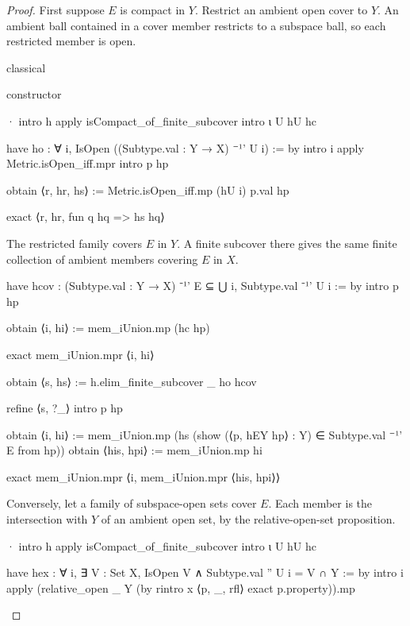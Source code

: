 \begin{proof}
  First suppose $E$ is compact in $Y$.
  Restrict an ambient open cover to $Y$.
  An ambient ball contained in a cover member restricts to a subspace ball, so each restricted
  member is open.

  \begin{lean}
    classical

    constructor

    · intro h
      apply isCompact_of_finite_subcover
      intro ι U hU hc

      have ho : ∀ i, IsOpen ((Subtype.val : Y → X) ⁻¹' U i) := by
        intro i
        apply Metric.isOpen_iff.mpr
        intro p hp

        obtain ⟨r, hr, hs⟩ := Metric.isOpen_iff.mp (hU i) p.val hp

        exact ⟨r, hr, fun q hq => hs hq⟩
  \end{lean}

  The restricted family covers $E$ in $Y$.
  A finite subcover there gives the same finite collection of ambient members covering $E$ in $X$.

  \begin{lean}
    have hcov : (Subtype.val : Y → X) ⁻¹' E ⊆ ⋃ i, Subtype.val ⁻¹' U i := by
      intro p hp

      obtain ⟨i, hi⟩ := mem_iUnion.mp (hc hp)

      exact mem_iUnion.mpr ⟨i, hi⟩

    obtain ⟨s, hs⟩ := h.elim_finite_subcover _ ho hcov

    refine ⟨s, ?_⟩
    intro p hp

    obtain ⟨i, hi⟩ := mem_iUnion.mp (hs (show (⟨p, hEY hp⟩ : Y) ∈ Subtype.val ⁻¹' E from hp))
    obtain ⟨his, hpi⟩ := mem_iUnion.mp hi

    exact mem_iUnion.mpr ⟨i, mem_iUnion.mpr ⟨his, hpi⟩⟩
  \end{lean}

  Conversely, let a family of subspace-open sets cover $E$.
  Each member is the intersection with $Y$ of an ambient open set, by the relative-open-set
  proposition.

  \begin{lean}
    · intro h
      apply isCompact_of_finite_subcover
      intro ι U hU hc

      have hex : ∀ i, ∃ V : Set X, IsOpen V ∧ Subtype.val '' U i = V ∩ Y := by
        intro i
        apply (relative_open _ Y (by
          rintro x ⟨p, _, rfl⟩
          exact p.property)).mp


\end{lean}
\end{proof}

